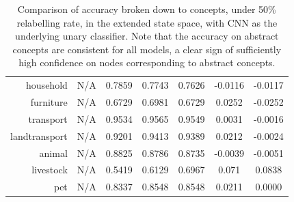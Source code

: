 \documentclass[11pt,a4paper]{article}
\begin{document}
\begin{table}[htbp]
\begin{tabular}{r|c|c|c|c|c|c}
household     & N/A    & 0.7859 & 0.7743 & 0.7626 & -0.0116 & -0.0117\\
furniture     & N/A    & 0.6729 & 0.6981 & 0.6729 & 0.0252 & -0.0252\\
transport     & N/A    & 0.9534 & 0.9565 & 0.9549 & 0.0031 & -0.0016\\
landtransport & N/A    & 0.9201 & 0.9413 & 0.9389 & 0.0212 & -0.0024\\
animal        & N/A    & 0.8825 & 0.8786 & 0.8735 & -0.0039 & -0.0051\\
livestock     & N/A    & 0.5419 & 0.6129 & 0.6967 & 0.071 & 0.0838\\
pet           & N/A    & 0.8337 & 0.8548 & 0.8548 & 0.0211 & 0.0000
\end{tabular}
\caption{Comparison of accuracy broken down to concepts, under 50\% relabelling rate, in the extended state space, with CNN as the underlying unary classifier. Note that the accuracy on abstract concepts are consistent for all models, a clear sign of sufficiently high confidence on nodes corresponding to abstract concepts.}
\label{tab:cnn50acc}
\end{table}
\end{document}
